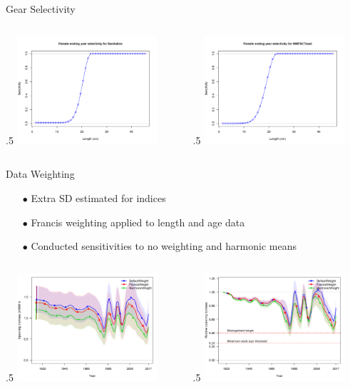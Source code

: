\documentclass[ignorenonframetext,]{beamer}
\def\begincols{\begin{columns}}
\def\begincol{\begin{column}}
\def\endcol{\end{column}}
\def\endcols{\end{columns}}
\begin{document}
\begin{frame}{Gear Selectivity}

\begincols
 \begincol{.5\textwidth}
\includegraphics[height=4cm]{r4ss/plots_mod1/sel09_len_flt7sex1.png}

\endcol
 \begincol{.5\textwidth}
\includegraphics[height=4cm]{r4ss/plots_mod1/sel09_len_flt8sex1.png}
\endcol
\endcols

\end{frame}

\begin{frame}{Data Weighting}

\begin{itemize}
\item[$\bullet$] Extra SD estimated for indices
\item[$\bullet$] Francis weighting applied to length and age data
\item[$\bullet$] Conducted sensitivities to no weighting and harmonic means
\end{itemize}

\begincols
 \begincol{.5\textwidth}
\includegraphics[height=4cm]{Figures/Data_weighting_spawnb.png} \endcol
 \begincol{.5\textwidth}
\includegraphics[height=4cm]{Figures/Data_weighting_Bratio.png} \endcol
\endcols

\end{frame}
\end{document}
